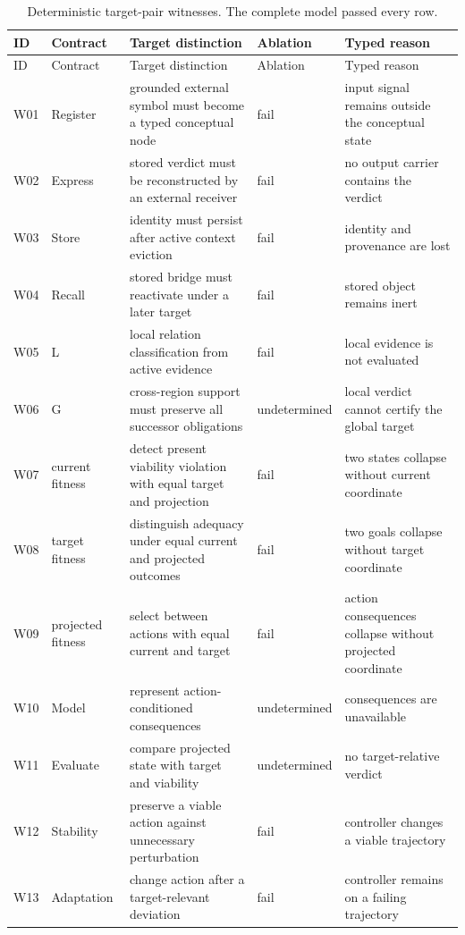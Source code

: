 \begin{longtable}{p{}p{}p{}p{}p{}}
\caption{Deterministic target-pair witnesses. The complete model passed every row.}\label{tab:witness}\\
\toprule ID & Contract & Target distinction & Ablation & Typed reason \\ \midrule \endfirsthead
\toprule ID & Contract & Target distinction & Ablation & Typed reason \\ \midrule \endhead
W01 & Register & grounded external symbol must become a typed conceptual node & fail & input signal remains outside the conceptual state \\
W02 & Express & stored verdict must be reconstructed by an external receiver & fail & no output carrier contains the verdict \\
W03 & Store & identity must persist after active context eviction & fail & identity and provenance are lost \\
W04 & Recall & stored bridge must reactivate under a later target & fail & stored object remains inert \\
W05 & L & local relation classification from active evidence & fail & local evidence is not evaluated \\
W06 & G & cross-region support must preserve all successor obligations & undetermined & local verdict cannot certify the global target \\
W07 & current fitness & detect present viability violation with equal target and projection & fail & two states collapse without current coordinate \\
W08 & target fitness & distinguish adequacy under equal current and projected outcomes & fail & two goals collapse without target coordinate \\
W09 & projected fitness & select between actions with equal current and target & fail & action consequences collapse without projected coordinate \\
W10 & Model & represent action-conditioned consequences & undetermined & consequences are unavailable \\
W11 & Evaluate & compare projected state with target and viability & undetermined & no target-relative verdict \\
W12 & Stability & preserve a viable action against unnecessary perturbation & fail & controller changes a viable trajectory \\
W13 & Adaptation & change action after a target-relevant deviation & fail & controller remains on a failing trajectory \\

\end{longtable}
